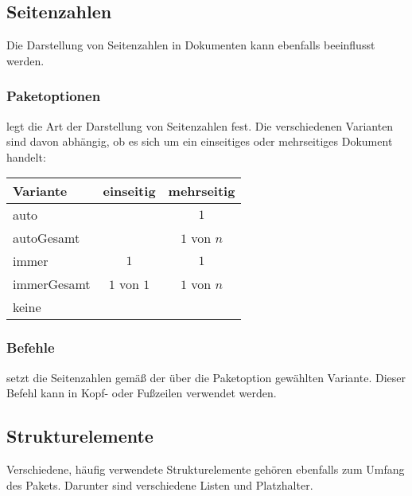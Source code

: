\subsection{Seitenzahlen}
    Die Darstellung von Seitenzahlen in Dokumenten kann ebenfalls beeinflusst werden.

\subsubsection{Paketoptionen}
\begin{options}
     
        legt die Art der Darstellung von Seitenzahlen fest. Die verschiedenen Varianten sind davon abhängig, ob es sich um ein einseitiges oder mehrseitiges Dokument handelt:

        \begin{tabular}{lcc}
            \toprule
            \textbf{Variante}& \textbf{einseitig} & \textbf{mehrseitig} \\
            \midrule
            auto &  & $1$ \\
            autoGesamt &  & $1$ von $n$ \\
            immer & $1$ & $1$ \\
            immerGesamt & $1$ von $1$ &  $1$ von $n$ \\
            keine &  &  \\
            \bottomrule
        \end{tabular}
\end{options}

\subsubsection{Befehle}
\begin{commands}
      setzt die Seitenzahlen gemäß der über die Paketoption  gewählten Variante. Dieser Befehl kann in Kopf- oder Fußzeilen verwendet werden.
\end{commands}


\subsection{Strukturelemente}
    Verschiedene, häufig verwendete Strukturelemente gehören ebenfalls zum Umfang des Pakets. Darunter sind verschiedene Listen und Platzhalter.

